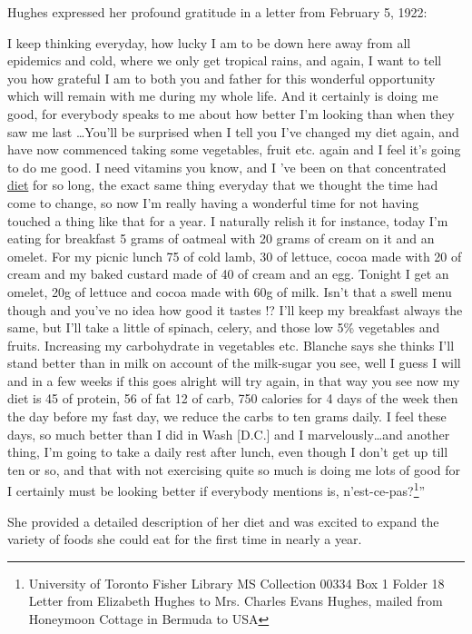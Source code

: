 \documentclass[12pt]{article}
\begin{document}
Hughes expressed her profound gratitude in a letter from February 5, 1922: 
\begin{singlespace}
I keep thinking everyday, how lucky I am to be down here away from all epidemics and cold, where we only get tropical rains, and again, I want to tell you how grateful I am to both you and father for this wonderful opportunity which will remain with me during my whole life. And it certainly is doing me good, for everybody speaks to me about how  better I'm looking than when they saw me last \dots You'll be surprised when I tell you I've changed my diet again, and have now commenced taking some vegetables, fruit etc. again and I feel it's going to do me good. I need vitamins you know, and I 've been on that concentrated \underline{diet} for so long, the exact same thing everyday that we thought the time had come to change, so now I'm really having a wonderful time for not having touched a thing like that for a year. I naturally relish it for instance, today I'm eating for breakfast 5 grams of oatmeal with 20 grams of cream on it and an omelet. For my picnic lunch 75 of cold lamb, 30 of lettuce, cocoa made with 20 of cream and my baked custard made of 40 of cream and an egg. Tonight I get an omelet, 20g of lettuce and cocoa made with 60g of milk. Isn't that a swell menu though and you've no idea how good it tastes !? I'll keep my breakfast always the same, but I'll take a little of spinach, celery, and those low 5\% vegetables and fruits. Increasing my carbohydrate in vegetables etc. Blanche says she thinks I'll stand better than in milk on account of the milk-sugar you see, well I guess I will and in a few weeks if this goes alright will try again, in that way you see now my diet is 45 of protein, 56 of fat 12 of carb, 750 calories for 4 days of the week then the day before my fast day, we reduce the carbs to ten grams daily. I feel  these days, so much better than I did in Wash [D.C.] and I  marvelously\dots and another thing, I'm going to take a daily rest after lunch, even though I don't get up till ten or so, and that with not exercising quite so much is doing me lots of good for I certainly must be looking better if everybody mentions is, n'est-ce-pas?\footnote{University of Toronto Fisher Library MS Collection 00334 Box 1 Folder 18 Letter from Elizabeth Hughes to Mrs. Charles Evans Hughes, mailed from Honeymoon Cottage in Bermuda to USA}''
\end{singlespace}
She provided a detailed description of her diet and was excited to expand the variety of foods she could eat for the first time in nearly a year. 
\end{document}
